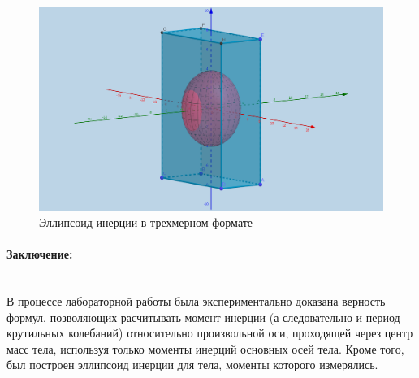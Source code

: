 \documentclass[a4paper, 12pt]{article}
\newcommand{\parag}[1]{\paragraph*{#1:}}
\begin{document}
\begin{figure}
    \centering
    \includegraphics[width=15cm]{ellipsis4.png}
	\caption{Эллипсоид инерции в трехмерном формате}
    \label{pic:graph}
\end{figure}

\parag {Заключение} ~\\
В процессе лабораторной работы была экспериментально доказана верность формул, позволяющих расчитывать момент инерции (а следовательно и период крутильных колебаний) относительно произвольной оси, проходящей через центр масс тела, используя только моменты инерций основных осей тела. Кроме того, был построен эллипсоид инерции для тела, моменты которого измерялись.
\end{document}
